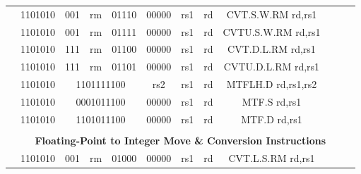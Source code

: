 \begin{table}[p]
\begin{small}
\begin{center}
\begin{tabular}{rcccccccccccl}
&
\multicolumn{1}{|c|}{1101010} &
\multicolumn{1}{c|}{001} &
\multicolumn{1}{c|}{rm} &
\multicolumn{2}{c|}{01110} &
\multicolumn{1}{c|}{00000} &
\multicolumn{1}{c|}{rs1} &
\multicolumn{1}{c|}{rd} & CVT.S.W.RM rd,rs1 \\
\cline{2-9}
  

&
\multicolumn{1}{|c|}{1101010} &
\multicolumn{1}{c|}{001} &
\multicolumn{1}{c|}{rm} &
\multicolumn{2}{c|}{01111} &
\multicolumn{1}{c|}{00000} &
\multicolumn{1}{c|}{rs1} &
\multicolumn{1}{c|}{rd} & CVTU.S.W.RM rd,rs1 \\
\cline{2-9}
  

&
\multicolumn{1}{|c|}{1101010} &
\multicolumn{1}{c|}{111} &
\multicolumn{1}{c|}{rm} &
\multicolumn{2}{c|}{01100} &
\multicolumn{1}{c|}{00000} &
\multicolumn{1}{c|}{rs1} &
\multicolumn{1}{c|}{rd} & CVT.D.L.RM rd,rs1 \\
\cline{2-9}
  

&
\multicolumn{1}{|c|}{1101010} &
\multicolumn{1}{c|}{111} &
\multicolumn{1}{c|}{rm} &
\multicolumn{2}{c|}{01101} &
\multicolumn{1}{c|}{00000} &
\multicolumn{1}{c|}{rs1} &
\multicolumn{1}{c|}{rd} & CVTU.D.L.RM rd,rs1 \\
\cline{2-9}
  

&
\multicolumn{1}{|c|}{1101010} &
\multicolumn{4}{c|}{1101111100} &
\multicolumn{1}{c|}{rs2} &
\multicolumn{1}{c|}{rs1} &
\multicolumn{1}{c|}{rd} & MTFLH.D rd,rs1,rs2 \\
\cline{2-9}
  

&
\multicolumn{1}{|c|}{1101010} &
\multicolumn{4}{c|}{0001011100} &
\multicolumn{1}{c|}{00000} &
\multicolumn{1}{c|}{rs1} &
\multicolumn{1}{c|}{rd} & MTF.S rd,rs1 \\
\cline{2-9}
  

&
\multicolumn{1}{|c|}{1101010} &
\multicolumn{4}{c|}{1101011100} &
\multicolumn{1}{c|}{00000} &
\multicolumn{1}{c|}{rs1} &
\multicolumn{1}{c|}{rd} & MTF.D rd,rs1 \\
\cline{2-9}
  

&
\multicolumn{11}{c}{} & \\
&
\multicolumn{11}{c}{\bf Floating-Point to Integer Move \& Conversion Instructions} & \\
\cline{2-9}
  

&
\multicolumn{1}{|c|}{1101010} &
\multicolumn{1}{c|}{001} &
\multicolumn{1}{c|}{rm} &
\multicolumn{2}{c|}{01000} &
\multicolumn{1}{c|}{00000} &
\multicolumn{1}{c|}{rs1} &
\multicolumn{1}{c|}{rd} & CVT.L.S.RM rd,rs1 \\
\cline{2-9}
  


\end{tabular}
\end{center}
\end{small}
\end{table}
